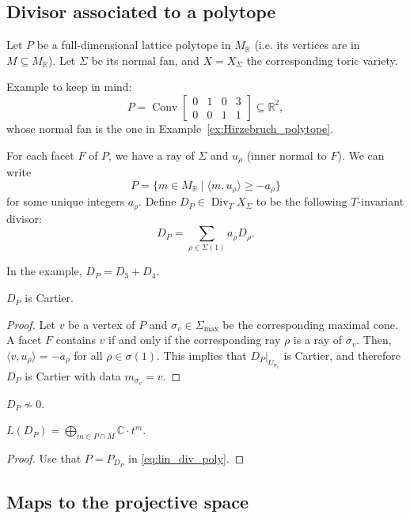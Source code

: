 \documentclass[a4paper,12pt]{amsart}
\newcommand{\RR}{\mathbb{R}}
\newcommand{\CC}{\mathbb{C}}
\DeclareMathOperator{\Conv}{Conv}
\DeclareMathOperator{\Div}{Div}
\begin{document}
\subsection{Divisor associated to a polytope}

Let $P$ be a full-dimensional lattice polytope in $M_\RR$ (i.e. its vertices are in $M \subseteq M_\RR$). Let $\Sigma$ be its normal fan, and $X = X_\Sigma$ the corresponding toric variety.

Example to keep in mind:
$$
P = \Conv \begin{bmatrix}
0 & 1 & 0 & 3 \\
0 & 0 & 1 & 1
\end{bmatrix} \subseteq \RR^2,
$$
whose normal fan is the one in Example~\ref{ex:Hirzebruch_polytope}.

For each facet $F$ of $P$, we have a ray of $\Sigma$ and $u_\rho$ (inner normal to $F$). We can write
$$
P = \{ m \in M_\RR \mid \langle m , u_\rho \rangle \geq - a_\rho \}
$$
for some unique integers $a_\rho$. Define $D_P \in \Div_T X_\Sigma$ to be the following $T$-invariant divisor:
$$
D_P = \sum_{\rho \in \Sigma(1)} a_\rho D_\rho.
$$

In the example, $D_P = D_3 + D_4$.

\begin{proposition}
$D_P$ is Cartier.
\end{proposition}

\begin{proof}
Let $v$ be a vertex of $P$ and $\sigma_v \in \Sigma_{\max}$ be the corresponding maximal cone. A facet $F$ contains $v$ if and only if the corresponding ray $\rho$ is a ray of $\sigma_v$. Then, $\langle v , u_\rho \rangle = - a_\rho$ for all $\rho \in \sigma(1)$. This implies that $\left. D_P \right|_{U_{\sigma_v}}$ is Cartier, and therefore $D_P$ is Cartier with data $m_{\sigma_v} = v$.
\end{proof}

\begin{exercise}
$D_P \not\sim 0$.
\end{exercise}

\begin{proposition}
$L(D_P) = \displaystyle \bigoplus_{m \in P \cap M} \CC \cdot t^m$.
\end{proposition}

\begin{proof}
Use that $P = P_{D_P}$ in \eqref{eq:lin_div_poly}.
\end{proof}

\subsection{Maps to the projective space}
\end{document}
